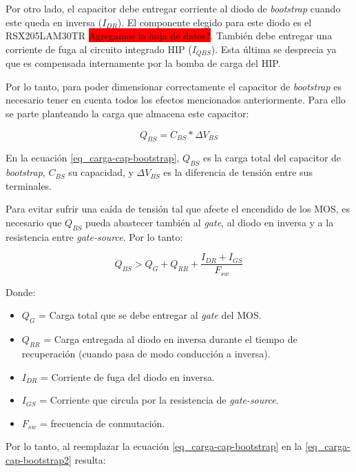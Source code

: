 \noindent Por otro lado, el capacitor debe entregar corriente al diodo de \textsl{bootstrap} cuando este queda en inversa ($I_{DR}$). El componente elegido para este diodo es el RSX205LAM30TR \colorbox{red}{Agregamos la hoja de datos?}. También debe entregar una corriente de fuga al circuito integrado HIP ($I_{QBS}$). Esta última se desprecia ya que es compensada internamente por la bomba de carga del HIP.

\noindent Por lo tanto, para poder dimensionar correctamente el capacitor de \textsl{bootstrap} es necesario tener en cuenta todos los efectos mencionados anteriormente. Para ello se parte planteando la carga que almacena este capacitor:

\begin{equation} \label{eq_carga-cap-bootstrap}
	Q_{BS}=C_{BS}*\Delta V_{BS}
\end{equation}

\noindent En la ecuación \ref{eq_carga-cap-bootstrap}, $Q_{BS}$ es la carga total del capacitor de \textsl{bootstrap}, $C_{BS}$ su capacidad, y $\Delta V_{BS}$ es la diferencia de  tensión entre sus terminales. 

\noindent Para evitar sufrir una caída de tensión tal que afecte el encendido de los MOS, es necesario que $Q_{BS}$ pueda abastecer también al \textsl{gate}, al diodo en inversa y a la resistencia entre \textsl{gate-source}. Por lo tanto:

\begin{equation} \label{eq_carga-cap-bootstrap2}
	Q_{BS} > Q_G + Q_{RR} + \frac{I_{DR}+I_{GS}}{F_{sw}}
\end{equation}

\noindent Donde:
\begin{itemize}
	\item $Q_G$ = Carga total que se debe entregar al \textsl{gate} del MOS.
	\item $Q_{RR}$ = Carga entregada al diodo en inversa durante el tiempo de recuperación (cuando pasa de modo conducción a inversa).
	\item $I_{DR}$ = Corriente de fuga del diodo en inversa.
	\item $I_{GS}$ = Corriente que circula por la resistencia de \textsl{gate-source}.
	\item $F_{sw}$ = frecuencia de conmutación.
\end{itemize}


\noindent Por lo tanto, al reemplazar la ecuación \ref{eq_carga-cap-bootstrap} en la \ref{eq_carga-cap-bootstrap2} resulta:


